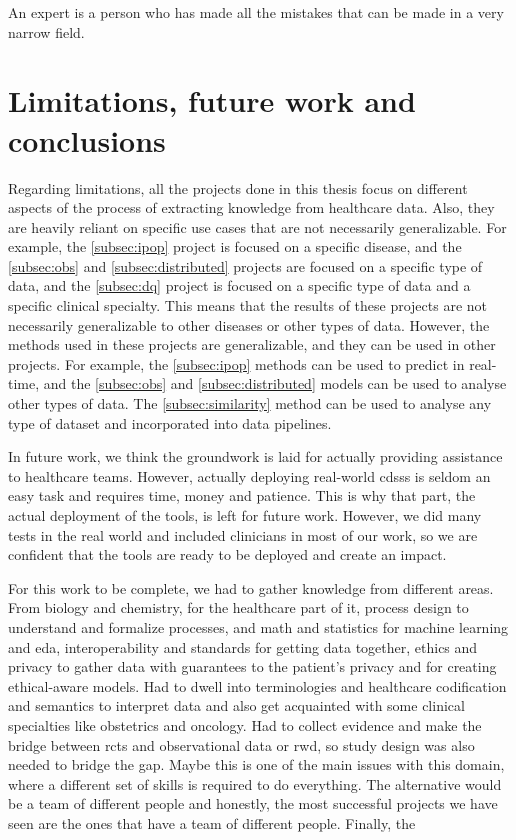 \begin{savequote}[75mm]
An expert is a person who has made all the mistakes that can be made in a very narrow field.
\end{savequote}
\chapter{Limitations, future work and conclusions} \label{chap:conclusion}

Regarding limitations, all the projects done in this thesis focus on different aspects of the process of extracting knowledge from healthcare data. Also, they are heavily reliant on specific use cases that are not necessarily generalizable. For example, the \ref{subsec:ipop} project is focused on a specific disease, and the \ref{subsec:obs} and \ref{subsec:distributed} projects are focused on a specific type of data, and the \ref{subsec:dq} project is focused on a specific type of data and a specific clinical specialty. This means that the results of these projects are not necessarily generalizable to other diseases or other types of data. However, the methods used in these projects are generalizable, and they can be used in other projects. For example, the \ref{subsec:ipop} methods can be used to predict in real-time, and the \ref{subsec:obs} and \ref{subsec:distributed} models can be used to analyse other types of data. The \ref{subsec:similarity} method can be used to analyse any type of dataset and incorporated into data pipelines.

In future work, we think the groundwork is laid for actually providing assistance to healthcare teams. However, actually deploying real-world \acp{cdss} is seldom an easy task and requires time, money and patience. This is why that part, the actual deployment of the tools, is left for future work. However, we did many tests in the real world and included clinicians in most of our work, so we are confident that the tools are ready to be deployed and create an impact.



For this work to be complete, we had to gather knowledge from different areas. From biology and chemistry, for the healthcare part of it, process design to understand and formalize processes, and math and statistics for machine learning and \ac{eda}, interoperability and standards for getting data together, ethics and privacy to gather data with guarantees to the patient's privacy and for creating ethical-aware models. Had to dwell into terminologies and healthcare codification and semantics to interpret data and also get acquainted with some clinical specialties like obstetrics and oncology. Had to collect evidence and make the bridge between \acp{rct} and observational data or \ac{rwd}, so study design was also needed to bridge the gap.
Maybe this is one of the main issues with this domain, where a different set of skills is required to do everything. The alternative would be a team of different people and honestly, the most successful projects we have seen are the ones that have a team of different people.
Finally, the 

